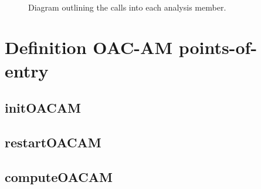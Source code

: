 \documentclass[11pt]{report}
\begin{document}
\begin{figure}[p]
 \\
\caption{Diagram outlining the calls into each analysis member.}
\label{OAC-AM}
\end{figure}

\section{Definition OAC-AM points-of-entry}

\subsection{initOACAM}

\subsection{restartOACAM}

\subsection{computeOACAM}
\end{document}
